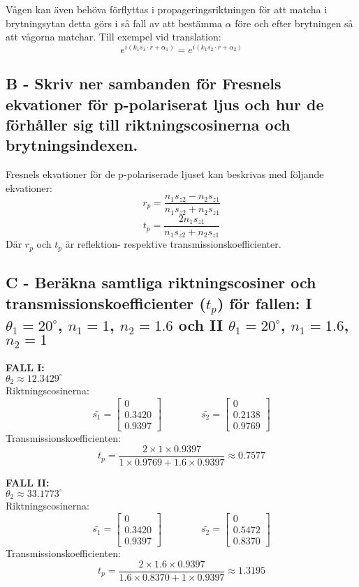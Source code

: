 \documentclass{article}
\begin{document}
    Vågen kan även behöva förflyttas i propageringsriktningen för att matcha i brytningsytan detta görs i så fall av att bestämma $\alpha$ före och efter brytningen så att vågorna matchar. Till exempel vid translation:
    \[
      e^{i(k_1\bar{s_1}\cdot\bar{r}+\alpha_1)}=e^{i(k_1\bar{s_2}\cdot\bar{r}+\alpha_2)}
    \]

  \subsection*{B - Skriv ner sambanden för Fresnels ekvationer för p-polariserat ljus och hur de förhåller sig till riktningscosinerna och brytningsindexen.}
    Fresnels ekvationer för de p-polariserade ljuset kan beskrivas med följande ekvationer:
    \[
      r_p = \frac{n_1s_{z2}-n_2s_{z1}}{n_1s_{z2}+n_2s_{z1}}
    \]
    \[
      t_p = \frac{2n_1s_{z1}}{n_1s_{z2}+n_2s_{z1}}
    \]
    Där $r_p$ och $t_p$ är reflektion- respektive transmissionskoefficienter.

  \subsection*{C - Beräkna samtliga riktningscosiner och transmissionskoefficienter ($t_p$) för fallen: \textbf{I} $\theta_1=20^{\circ}$, $n_1=1$, $n_2=1.6$ och \textbf{II} $\theta_1=20^{\circ}$, $n_1=1.6$, $n_2=1$}
    \textbf{FALL I:}\\
    $\theta_2\approx12.3429^{\circ}$\\
    Riktningscosinerna:
    \[
      \bar{s_1} =
      \begin{bmatrix}
        0\\0.3420\\0.9397
      \end{bmatrix}
      \qquad\qquad
      \bar{s_2} =
      \begin{bmatrix}
        0\\0.2138\\0.9769
      \end{bmatrix}
    \]
    Transmissionskoefficienten:
    \[
      t_p = \frac{2\times1\times0.9397}{1\times0.9769+1.6\times0.9397}\approx0.7577
    \]

    \textbf{FALL II:}\\
    $\theta_2\approx33.1773^{\circ}$\\
    Riktningscosinerna:
    \[
      \bar{s_1} =
      \begin{bmatrix}
        0\\0.3420\\0.9397
      \end{bmatrix}
      \qquad\qquad
      \bar{s_2} =
      \begin{bmatrix}
        0\\0.5472\\0.8370
      \end{bmatrix}
    \]
    Transmissionskoefficienten:
    \[
      t_p = \frac{2\times1.6\times0.9397}{1.6\times0.8370+1\times0.9397}\approx1.3195
    \]
\end{document}
